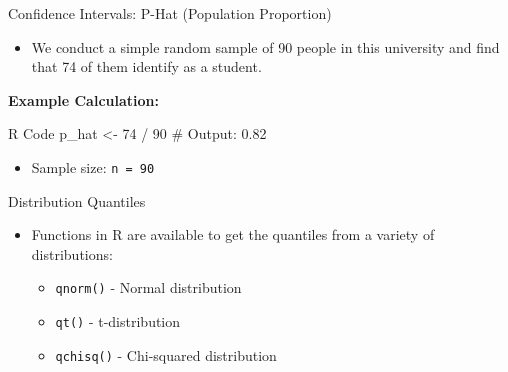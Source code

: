 \documentclass{beamer}
\begin{document}
\begin{frame}{Confidence Intervals: P-Hat (Population Proportion)}
    \begin{itemize}
        \item We conduct a simple random sample of 90 people in this university and find that 74 of them identify as a student.
    \end{itemize}

    \textbf{Example Calculation:}
    \begin{block}{R Code}
p_hat <- 74 / 90
# Output: 0.82
    \end{block}
    
    \begin{itemize}
        \item Sample size: \texttt{n = 90}
    \end{itemize}
\end{frame}

\begin{frame}{Distribution Quantiles}
    \begin{itemize}
        \item Functions in R are available to get the quantiles from a variety of distributions:
        \begin{itemize}
            \item \texttt{qnorm()} - Normal distribution
            \item \texttt{qt()} - t-distribution
            \item \texttt{qchisq()} - Chi-squared distribution
        \end{itemize}
    \end{itemize}
\end{frame}
\end{document}
